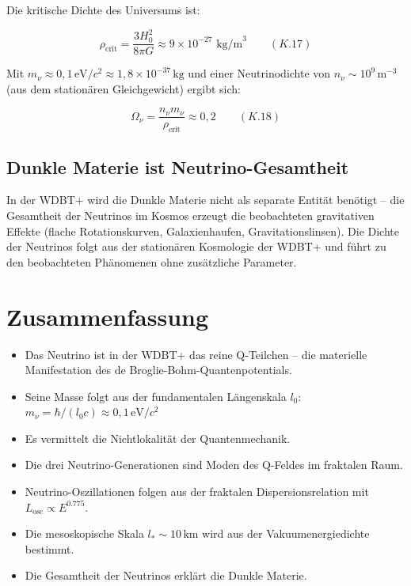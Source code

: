 Die kritische Dichte des Universums ist:

\[
\rho_{\text{crit}} = \frac{3H_0^2}{8\pi G} \approx 9 \times 10^{-27} \text{ kg/m}^3 \qquad (K.17)
\]

Mit $m_{\nu} \approx 0,1\,\text{eV}/c^2 \approx 1,8 \times 10^{-37}\,\text{kg}$ und einer 
Neutrinodichte von $n_{\nu} \sim 10^9\,\text{m}^{-3}$ (aus dem stationären Gleichgewicht) 
ergibt sich:

\[
\Omega_{\nu} = \frac{n_{\nu} m_{\nu}}{\rho_{\text{crit}}} \approx 0,2 \qquad (K.18)
\]

\subsection{Dunkle Materie ist Neutrino-Gesamtheit}

In der WDBT+ wird die Dunkle Materie nicht als separate Entität benötigt – die 
Gesamtheit der Neutrinos im Kosmos erzeugt die beobachteten gravitativen Effekte 
(flache Rotationskurven, Galaxienhaufen, Gravitationslinsen). Die Dichte der Neutrinos 
folgt aus der stationären Kosmologie der WDBT+ und führt zu den beobachteten 
Phänomenen ohne zusätzliche Parameter.

\section{Zusammenfassung}

\begin{itemize}
    \item Das Neutrino ist in der WDBT+ das reine Q-Teilchen – die materielle 
          Manifestation des de Broglie-Bohm-Quantenpotentials.
    \item Seine Masse folgt aus der fundamentalen Längenskala $l_0$:
          $m_{\nu} = \hbar/(l_0 c) \approx 0,1\,\text{eV}/c^2$
    \item Es vermittelt die Nichtlokalität der Quantenmechanik.
    \item Die drei Neutrino-Generationen sind Moden des Q-Feldes im fraktalen Raum.
    \item Neutrino-Oszillationen folgen aus der fraktalen Dispersionsrelation mit 
          $L_{\text{osc}} \propto E^{0.775}$.
    \item Die mesoskopische Skala $l_* \sim 10\,\text{km}$ wird aus der Vakuumenergiedichte 
          bestimmt.
    \item Die Gesamtheit der Neutrinos erklärt die Dunkle Materie.
\end{itemize}